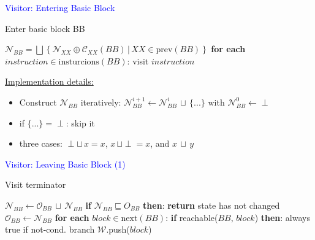 \documentclass[10pt,handout]{beamer}
\begin{document}
\begin{frame}[fragile]{\textcolor{blue}{Visitor: Entering Basic Block}}
\begin{algorithm}[H]
\caption{Enter basic block BB}
\begin{algorithmic}[1]
\State $\mathcal{N}_{BB}= \bigsqcup \left\lbrace \mathcal{N}_{XX} \oplus \mathcal{C}_{XX}(BB) \,|\, XX \in \text{prev}(BB) \right\rbrace$
\State \textbf{for each} $instruction \in \text{insturcions}(BB)$:
\State \qquad visit $instruction$
\EndProcedure
\end{algorithmic}
\end{algorithm}
\vfill
\underline{Implementation details:}
\begin{itemize}
\item Construct $\mathcal{N}_{BB}$ iteratively: $\mathcal{N}_{BB}^{i+1} \gets \mathcal{N}_{BB}^{i} \,\sqcup\, \{ ... \}$ with $\mathcal{N}_{BB}^{0}\gets\perp$
\item if $\{...\}=\perp$: skip it
\item three cases: 
$\perp \sqcup\, x = x$,
$x \,\sqcup \perp = x$, and
$x \,\sqcup\, y$
\end{itemize}
\end{frame}


\begin{frame}[fragile]{\textcolor{blue}{Visitor: Leaving Basic Block (1)}}
\begin{algorithm}[H]
\caption{Visit terminator}
\begin{algorithmic}[1]
\State $\mathcal{N}_{BB} \gets \mathcal{O}_{BB} \,\sqcup\, \mathcal{N}_{BB}$
\State \textbf{if} $\mathcal{N}_{BB} \sqsubseteq O_{BB}$ \textbf{then}:
\State \qquad \textbf{return}
\Comment state has not changed
\State $\mathcal{O}_{BB} \gets \mathcal{N}_{BB}$
\State \textbf{for each} $block \in \text{next}(BB)$:
\State \qquad\textbf{if} reachable($BB,\,block$) \textbf{then}:
\Comment always true if not-cond. branch
\State \qquad\qquad $\mathcal{W}$.push($block$)
\EndProcedure
\end{algorithmic}
\end{algorithm}
\end{frame}
\end{document}
